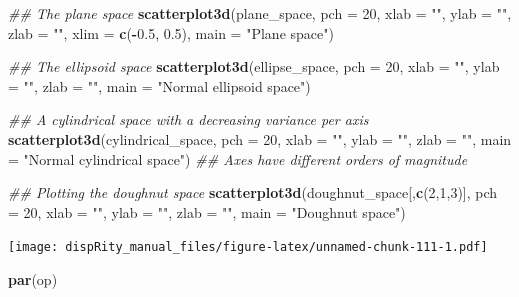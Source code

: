 \documentclass[]{book}
\newenvironment{Shaded}{\begin{snugshade}}{\end{snugshade}}
\newcommand{\CommentTok}[1]{\textcolor[rgb]{0.56,0.35,0.01}{\textit{#1}}}
\newcommand{\DataTypeTok}[1]{\textcolor[rgb]{0.13,0.29,0.53}{#1}}
\newcommand{\DecValTok}[1]{\textcolor[rgb]{0.00,0.00,0.81}{#1}}
\newcommand{\FloatTok}[1]{\textcolor[rgb]{0.00,0.00,0.81}{#1}}
\newcommand{\KeywordTok}[1]{\textcolor[rgb]{0.13,0.29,0.53}{\textbf{#1}}}
\newcommand{\NormalTok}[1]{#1}
\newcommand{\OperatorTok}[1]{\textcolor[rgb]{0.81,0.36,0.00}{\textbf{#1}}}
\newcommand{\StringTok}[1]{\textcolor[rgb]{0.31,0.60,0.02}{#1}}
\begin{document}
\begin{Shaded}
\begin{Highlighting}[]
\CommentTok{## The plane space}
\KeywordTok{scatterplot3d}\NormalTok{(plane_space, }\DataTypeTok{pch =} \DecValTok{20}\NormalTok{, }\DataTypeTok{xlab =} \StringTok{""}\NormalTok{, }\DataTypeTok{ylab =} \StringTok{""}\NormalTok{, }\DataTypeTok{zlab =} \StringTok{""}\NormalTok{,}
              \DataTypeTok{xlim =} \KeywordTok{c}\NormalTok{(}\OperatorTok{-}\FloatTok{0.5}\NormalTok{, }\FloatTok{0.5}\NormalTok{), }\DataTypeTok{main =} \StringTok{"Plane space"}\NormalTok{)}

\CommentTok{## The ellipsoid space}
\KeywordTok{scatterplot3d}\NormalTok{(ellipse_space, }\DataTypeTok{pch =} \DecValTok{20}\NormalTok{, }\DataTypeTok{xlab =} \StringTok{""}\NormalTok{, }\DataTypeTok{ylab =} \StringTok{""}\NormalTok{, }\DataTypeTok{zlab =} \StringTok{""}\NormalTok{,}
              \DataTypeTok{main =} \StringTok{"Normal ellipsoid space"}\NormalTok{)}

\CommentTok{## A cylindrical space with a decreasing variance per axis}
\KeywordTok{scatterplot3d}\NormalTok{(cylindrical_space, }\DataTypeTok{pch =} \DecValTok{20}\NormalTok{, }\DataTypeTok{xlab =} \StringTok{""}\NormalTok{, }\DataTypeTok{ylab =} \StringTok{""}\NormalTok{, }\DataTypeTok{zlab =} \StringTok{""}\NormalTok{,}
              \DataTypeTok{main =} \StringTok{"Normal cylindrical space"}\NormalTok{)}
\CommentTok{## Axes have different orders of magnitude}

\CommentTok{## Plotting the doughnut space}
\KeywordTok{scatterplot3d}\NormalTok{(doughnut_space[,}\KeywordTok{c}\NormalTok{(}\DecValTok{2}\NormalTok{,}\DecValTok{1}\NormalTok{,}\DecValTok{3}\NormalTok{)], }\DataTypeTok{pch =} \DecValTok{20}\NormalTok{, }\DataTypeTok{xlab =} \StringTok{""}\NormalTok{, }\DataTypeTok{ylab =} \StringTok{""}\NormalTok{,}
              \DataTypeTok{zlab =} \StringTok{""}\NormalTok{, }\DataTypeTok{main =} \StringTok{"Doughnut space"}\NormalTok{)}
\end{Highlighting}
\end{Shaded}

\texttt{[image: dispRity\_manual\_files/figure-latex/unnamed-chunk-111-1.pdf]}

\begin{Shaded}
\begin{Highlighting}[]
\KeywordTok{par}\NormalTok{(op)}
\end{Highlighting}
\end{Shaded}
\end{document}
